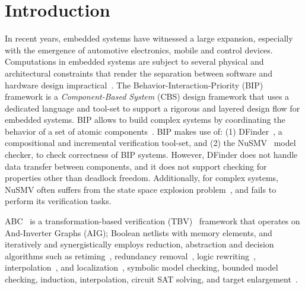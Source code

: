 \section{Introduction}
\label{sect-intro}

In recent years, embedded systems have witnessed a large 
expansion, especially with  the emergence of automotive 
electronics, mobile and control devices.
Computations in embedded systems are subject to several 
physical and architectural 
constraints that render the separation between software and 
hardware design impractical~\cite{henzinger2006embedded}.
The Behavior-Interaction-Priority (BIP) framework 
is a {\em Component-Based System} (CBS) design framework that uses a dedicated 
language and tool-set to support a rigorous and layered design flow for embedded systems.  
BIP allows to build complex systems by coordinating the behavior of a set of atomic components~\cite{BasuBBCJNS11}.
BIP makes use of: (1) DFinder~\cite{dfinder}, a compositional  
and incremental verification tool-set, and (2) the NuSMV~\cite{nusmv} model checker, to check correctness of BIP systems. 
However, DFinder \cite{BBL14} does not  handle data transfer between components, and it does not support checking for properties other than deadlock freedom. 
Additionally, for complex systems, NuSMV often suffers from the state space explosion 
problem~\cite{sipser2006introduction}, and fails to perform its verification tasks.

ABC~\cite{brayton2010abc} is a transformation-based 
verification (TBV)~\cite{kuehlmann2001transformation} framework that operates on And-Inverter Graphs (AIG); Boolean netlists with
memory elements, and iteratively and synergistically 
employs reduction, abstraction and decision algorithms such as 
retiming~\cite{KuBa01}, redundancy  removal~\cite{HmBPK05,KuMP01,BjesseC00,aziz-fmsd-00}, logic
rewriting~\cite{BjBo04}, interpolation~\cite{McMillan03}, 
and localization~\cite{Wang03}, symbolic model checking, bounded model checking, induction, interpolation,  circuit SAT solving, and target enlargement~\cite{MoGS00,MoMZ01,HoSH00,BaKuAb02,Hari05expert}.


